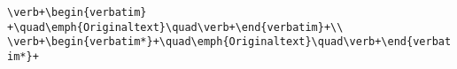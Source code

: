 \documentclass{article}
\begin{document}
\begin{small}\noindent%
\verb=\verb+\begin{verbatim} +\quad\emph{Originaltext}\quad\verb+\end{verbatim}+\\=\\
\verb=\verb+\begin{verbatim*}+\quad\emph{Originaltext}\quad\verb+\end{verbatim*}+=
\end{small} 
\end{document}
